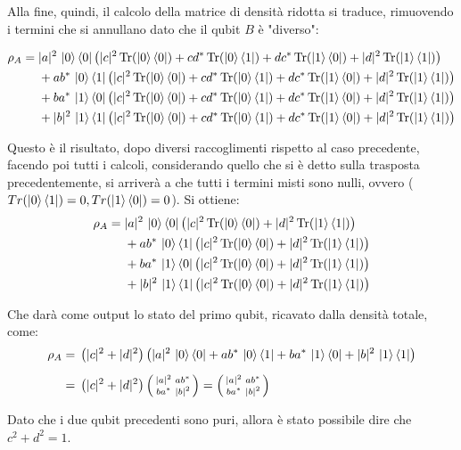\begin{info}
Alla fine, quindi, il calcolo della matrice di densità ridotta si traduce, rimuovendo i termini che si annullano dato che il qubit \(B\) è "diverso":

\begin{align*}
\rho_A ={}& |a|^2\,\ket{0}\bra{0}\left(|c|^2\,\mathrm{Tr}(\ket{0}\bra{0})+cd^*\,\mathrm{Tr}(\ket{0}\bra{1})+dc^*\,\mathrm{Tr}(\ket{1}\bra{0})+|d|^2\,\mathrm{Tr}(\ket{1}\bra{1})\right)\\
&+ab^*\,\ket{0}\bra{1}\left(|c|^2\,\mathrm{Tr}(\ket{0}\bra{0})+cd^*\,\mathrm{Tr}(\ket{0}\bra{1})+dc^*\,\mathrm{Tr}(\ket{1}\bra{0})+|d|^2\,\mathrm{Tr}(\ket{1}\bra{1})\right)\\
&+ba^*\,\ket{1}\bra{0}\left(|c|^2\,\mathrm{Tr}(\ket{0}\bra{0})+cd^*\,\mathrm{Tr}(\ket{0}\bra{1})+dc^*\,\mathrm{Tr}(\ket{1}\bra{0})+|d|^2\,\mathrm{Tr}(\ket{1}\bra{1})\right)\\
&+|b|^2\,\ket{1}\bra{1}\left(|c|^2\,\mathrm{Tr}(\ket{0}\bra{0})+cd^*\,\mathrm{Tr}(\ket{0}\bra{1})+dc^*\,\mathrm{Tr}(\ket{1}\bra{0})+|d|^2\,\mathrm{Tr}(\ket{1}\bra{1})\right)
\end{align*}

Questo è il risultato, dopo diversi raccoglimenti rispetto al caso precedente, facendo poi tutti i calcoli, considerando quello che si è detto sulla trasposta precedentemente, si arriverà a che tutti i termini misti sono nulli, ovvero (\(Tr(\ket{0}\bra{1})=0, Tr(\ket{1}\bra{0})=0\)). Si ottiene:
\begin{align*}
\rho_A ={}& |a|^2\,\ket{0}\bra{0}\left(|c|^2\,\mathrm{Tr}(\ket{0}\bra{0})+|d|^2\,\mathrm{Tr}(\ket{1}\bra{1})\right)\\
&+ab^*\,\ket{0}\bra{1}\left(|c|^2\,\mathrm{Tr}(\ket{0}\bra{0})+|d|^2\,\mathrm{Tr}(\ket{1}\bra{1})\right)\\
&+ba^*\,\ket{1}\bra{0}\left(|c|^2\,\mathrm{Tr}(\ket{0}\bra{0})+|d|^2\,\mathrm{Tr}(\ket{1}\bra{1})\right)\\
&+|b|^2\,\ket{1}\bra{1}\left(|c|^2\,\mathrm{Tr}(\ket{0}\bra{0})+|d|^2\,\mathrm{Tr}(\ket{1}\bra{1})\right)
\end{align*}

Che darà come output lo stato del primo qubit, ricavato dalla densità totale, come:
\begin{align*}
\rho_A
={}& \left(|c|^2+|d|^2\right)\left(
|a|^2\,\ket{0}\bra{0}+ab^*\,\ket{0}\bra{1}+ba^*\,\ket{1}\bra{0}+|b|^2\,\ket{1}\bra{1}
\right)\\[2mm]
={}& \left(|c|^2+|d|^2\right)
\left(
\begin{smallmatrix}
|a|^2 & ab^*\\
ba^* & |b|^2
\end{smallmatrix}
\right) = 
\left(
\begin{smallmatrix}
|a|^2 & ab^*\\
ba^* & |b|^2
\end{smallmatrix}
\right)
\end{align*}

Dato che i due qubit precedenti sono puri, allora è stato possibile dire che \(c^2 + d^2 = 1\). 
\end{info}

